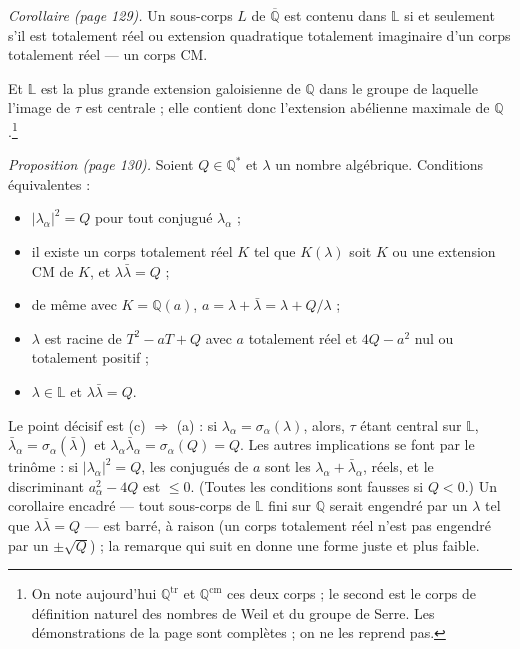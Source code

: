 \documentclass[11pt,a4paper]{article}
\begin{document}
\emph{Corollaire (page 129).} Un sous-corps $L$ de $\overline{\mathbb{Q}}$ est
contenu dans $\mathbb{L}$ si et seulement s'il est totalement réel ou extension
quadratique totalement imaginaire d'un corps totalement réel --- un corps CM.

Et $\mathbb{L}$ est la plus grande extension galoisienne de $\mathbb{Q}$ dans le
groupe de laquelle l'image de $\tau$ est centrale ; elle contient donc
l'extension abélienne maximale de $\mathbb{Q}$.\footnote{On note aujourd'hui
$\mathbb{Q}^{\mathrm{tr}}$ et $\mathbb{Q}^{\mathrm{cm}}$ ces deux corps ; le
second est le corps de définition naturel des nombres de Weil et du groupe de
Serre. Les démonstrations de la page sont complètes ; on ne les reprend pas.}

\emph{Proposition (page 130).} Soient $Q \in \mathbb{Q}^{*}$ et $\lambda$ un
nombre algébrique. Conditions équivalentes :
\begin{itemize}
  \item[(a)] $|\lambda_{\alpha}|^{2} = Q$ pour tout conjugué $\lambda_{\alpha}$ ;
  \item[(b)] il existe un corps totalement réel $K$ tel que $K(\lambda)$ soit $K$
  ou une extension CM de $K$, et $\lambda\bar{\lambda} = Q$ ;
  \item[(b$'$)] de même avec $K = \mathbb{Q}(a)$, $a = \lambda + \bar{\lambda} =
  \lambda + Q/\lambda$ ;
  \item[(b$''$)] $\lambda$ est racine de $T^{2} - aT + Q$ avec $a$ totalement
  réel et $4Q - a^{2}$ nul ou totalement positif ;
  \item[(c)] $\lambda \in \mathbb{L}$ et $\lambda\bar{\lambda} = Q$.
\end{itemize}
Le point décisif est (c) $\Rightarrow$ (a) : si $\lambda_{\alpha} =
\sigma_{\alpha}(\lambda)$, alors, $\tau$ étant central sur $\mathbb{L}$,
$\bar{\lambda}_{\alpha} = \sigma_{\alpha}(\bar{\lambda})$ et
$\lambda_{\alpha}\bar{\lambda}_{\alpha} = \sigma_{\alpha}(Q) = Q$. Les autres
implications se font par le trinôme : si $|\lambda_{\alpha}|^{2} = Q$, les
conjugués de $a$ sont les $\lambda_{\alpha} + \bar{\lambda}_{\alpha}$, réels, et
le discriminant $a_{\alpha}^{2} - 4Q$ est $\leqslant 0$. (Toutes les conditions
sont fausses si $Q < 0$.) Un corollaire encadré --- tout sous-corps de
$\mathbb{L}$ fini sur $\mathbb{Q}$ serait engendré par un $\lambda$ tel que
$\lambda\bar{\lambda} = Q$ --- est barré, à raison (un corps totalement réel
n'est pas engendré par un $\pm\sqrt{Q}$) ; la remarque qui suit en donne une
forme juste et plus faible.
\end{document}
